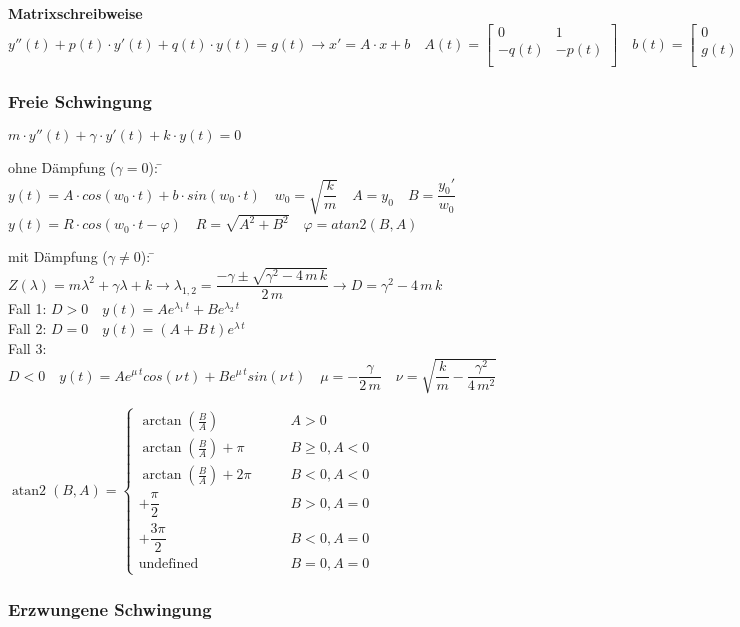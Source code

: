 \textbf{Matrixschreibweise}\\
$ y''(t) + p(t)\cdot y'(t) + q(t) \cdot y(t) = g(t) \rightarrow x' = A \cdot x + b \quad 
A(t)=\begin{bmatrix}
 0 & 1 \\
 -q(t) & -p(t)\\
\end{bmatrix} \quad
b(t)=\begin{bmatrix}
 0 \\
 g(t)\\
\end{bmatrix}$

\subsubsection{Freie Schwingung}
$m \cdot y''(t) + \gamma\cdot y'(t) + k \cdot y(t) = 0$\\
\begin{tabbing}
ohne Dämpfung ($\gamma = 0$): \= $y(t) = A \cdot cos(w_0 \cdot t) + b\cdot sin(w_0 \cdot t) \quad w_0=\sqrt{\dfrac{k}{m}} \quad  A=y_0 \quad B=\dfrac{y_0'}{w_0}$\\
\>$y(t) =R\cdot cos(w_0 \cdot t - \varphi) \quad R=\sqrt{A^2+B^2} \quad \varphi=atan2(B,A)$\\
\end{tabbing}

\begin{tabbing}
mit Dämpfung ($\gamma \neq 0$): \= $Z(\lambda)=m\lambda^2 + \gamma \lambda + k \rightarrow \lambda_{1,2}=\dfrac{-\gamma \pm \sqrt{\gamma^2 - 4 \, m \, k}}{2 \, m} \rightarrow D=\gamma^2 - 4 \, m \, k$\\
\> Fall 1: $D>0 \quad y(t)=Ae^{\lambda_1 \, t} + Be^{\lambda_2 \, t}$\\
\> Fall 2: $D=0 \quad y(t)=(A + B \,t)e^{\lambda \, t}$\\
\> Fall 3: $D<0 \quad y(t)=Ae^{\mu \, t}cos(\nu \, t) + Be^{\mu \, t}sin(\nu \, t) \quad \mu=-\dfrac{\gamma}{2\,m} \quad \nu = \sqrt{\dfrac{k}{m}-\dfrac{\gamma^2}{4 \, m^2}}$
\end{tabbing}

$\operatorname{atan2}(B, A) = \begin{cases}
\arctan\left(\frac B A\right) & \qquad A > 0 \\
\arctan\left(\frac B A\right) + \pi& \qquad B \ge 0 , A < 0 \\
\arctan\left(\frac B A\right) + 2\pi& \qquad B < 0 , A < 0 \\
+\dfrac{\pi}{2} & \qquad B > 0 , A = 0 \\
+\dfrac{3\pi}{2} & \qquad B < 0 , A = 0 \\
\text{undefined} & \qquad B = 0, A = 0
\end{cases}$

\subsubsection{Erzwungene Schwingung}

